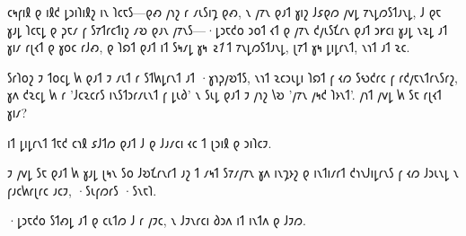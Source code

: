 𐑤𐑰𐑝𐑦𐑙 𐑞 𐑦𐑙𐑒 𐑛𐑮𐑦𐑐𐑦𐑙𐑟 𐑦𐑯 𐑐𐑤𐑱𐑕—𐑞𐑺 𐑢𐑪𐑟 𐑩 𐑥𐑧𐑕𐑦𐑡 𐑞𐑺, 𐑯 𐑢𐑳𐑯 𐑞𐑨𐑑 𐑣𐑦𐑟 𐑓𐑭𐑞𐑼 𐑢𐑫𐑛 𐑳𐑯𐑛𐑼𐑕𐑑𐑨𐑯𐑛, 𐑓 𐑞𐑱 𐑣𐑨𐑛 𐑐𐑤𐑱𐑛 𐑞 𐑜𐑱𐑥 𐑝 𐑕𐑳𐑑𐑩𐑤𐑑𐑦𐑟 𐑥𐑹 𐑞𐑨𐑯 𐑢𐑳𐑯𐑕—·𐑛𐑮𐑱𐑒𐑴 𐑮𐑴𐑑 𐑬𐑑 𐑞 𐑢𐑳𐑯 𐑒𐑢𐑧𐑕𐑗𐑩𐑯 𐑞𐑨𐑑 𐑮𐑾𐑤𐑦 𐑣𐑨𐑛 𐑯𐑷𐑛 𐑨𐑑 𐑣𐑦𐑥 𐑩𐑚𐑬𐑑 𐑞 𐑣𐑴𐑤 𐑩𐑓𐑺, 𐑞 𐑐𐑸𐑑 𐑞𐑨𐑑 𐑦𐑑 𐑕𐑰𐑥𐑛 𐑣𐑰 \emph{𐑷𐑑} 𐑑 𐑳𐑯𐑛𐑼𐑕𐑑𐑨𐑯𐑛, 𐑚𐑳𐑑 𐑣𐑰 𐑛𐑦𐑛𐑩𐑯𐑑, 𐑯𐑪𐑑 𐑨𐑑 𐑷𐑤.

\begin{writtenNote}

𐑕𐑩𐑐𐑴𐑟 𐑲 𐑑𐑴𐑤𐑛 𐑿 𐑞𐑨𐑑 𐑲 𐑥𐑧𐑑 𐑩 𐑕𐑑𐑿𐑛𐑩𐑯𐑑 𐑨𐑑 ·𐑣𐑪𐑜𐑢𐑹𐑑𐑕, 𐑯𐑪𐑑 𐑷𐑤𐑮𐑧𐑛𐑦 𐑐𐑸𐑑 𐑝 𐑬𐑼 𐑕𐑻𐑒𐑩𐑤 𐑝 𐑩𐑒𐑢𐑱𐑯𐑑𐑩𐑯𐑕𐑩𐑟, 𐑣𐑵 𐑒𐑷𐑤𐑛 𐑿 𐑩 '𐑓𐑤𐑷𐑤𐑩𐑕 𐑦𐑯𐑕𐑑𐑮𐑩𐑥𐑧𐑯𐑑 𐑝 𐑛𐑧𐑔' 𐑯 𐑕𐑧𐑛 𐑞𐑨𐑑 𐑲 𐑢𐑪𐑟 𐑘𐑹 '𐑢𐑳𐑯 𐑢𐑰𐑒 𐑐𐑶𐑯𐑑'. 𐑢𐑪𐑑 𐑢𐑫𐑛 𐑿 𐑕𐑱 𐑩𐑚𐑬𐑑 𐑣𐑦𐑥?

\end{writtenNote}

𐑦𐑑 𐑛𐑦𐑛𐑩𐑯𐑑 𐑑𐑱𐑒 𐑤𐑪𐑙 𐑭𐑓𐑑𐑼 𐑞𐑨𐑑 𐑓 𐑞 𐑓𐑨𐑥𐑤𐑦 𐑬𐑤 𐑑 𐑚𐑮𐑦𐑙 𐑞 𐑮𐑦𐑐𐑤𐑲.

\begin{writtenNote}

𐑲 𐑢𐑫𐑛 𐑕𐑱 𐑞𐑨𐑑 𐑿 𐑣𐑨𐑛 𐑚𐑰𐑯 𐑕𐑴 𐑓𐑹𐑗𐑩𐑯𐑩𐑑 𐑨𐑟 𐑑 𐑥𐑰𐑑 𐑕𐑳𐑥𐑢𐑳𐑯 𐑣𐑵 𐑦𐑯𐑡𐑶𐑟 𐑞 𐑦𐑯𐑑𐑦𐑥𐑩𐑑 𐑒𐑪𐑯𐑓𐑦𐑛𐑩𐑯𐑕 𐑝 𐑬𐑼 𐑓𐑮𐑧𐑯𐑛 𐑯 𐑝𐑨𐑤𐑿𐑩𐑚𐑩𐑤 𐑨𐑤𐑲, ·𐑕𐑧𐑝𐑼𐑩𐑕 ·𐑕𐑯𐑱𐑐.

\end{writtenNote}

·𐑛𐑮𐑱𐑒𐑴 𐑕𐑑𐑺𐑛 𐑨𐑑 𐑞 𐑤𐑧𐑑𐑼 𐑓 𐑩 𐑢𐑲𐑤, 𐑯 𐑓𐑲𐑯𐑩𐑤𐑦 𐑔𐑮𐑵 𐑦𐑑 𐑦𐑯𐑑𐑵 𐑞 𐑓𐑲𐑼.

